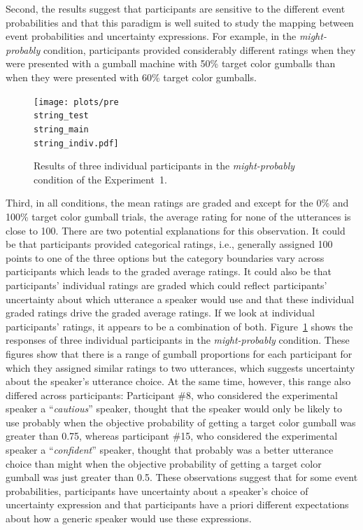 \documentclass[man, floatsintext]{apa6}
\begin{document}
Second, the results suggest that participants are sensitive to the different event probabilities and that this paradigm is well suited to study 
the mapping between event probabilities and uncertainty expressions. For example, in the \textit{might-probably} condition, participants
provided considerably different ratings when they were presented with a gumball machine with 50\% target color gumballs than when they
were presented with 60\% target color gumballs.

\begin{figure}
\texttt{[image: plots/pre\\string\_test\\string\_main\\string\_indiv.pdf]}
\caption{Results of three individual participants in the \emph{might-probably} condition of the Experiment~1. \label{fig:norming-results-indiv}}
\end{figure}


Third, in all conditions, the mean ratings are graded and except for the 0\% and 100\% target color gumball trials, the average rating for none of the
utterances is close to 100. There are two potential explanations for this observation. It could be that participants provided categorical ratings, i.e.,
generally assigned 100 points to one of the three options but the category boundaries vary across participants which leads to the graded average ratings.
It could also be that participants' individual ratings are graded which could reflect participants' uncertainty about which utterance a speaker would use 
and that these individual graded ratings drive the  graded average ratings. If we look at individual participants' ratings, it appears to be a combination of both.
Figure~\ref{fig:norming-results-indiv} shows the responses of three individual participants in the \emph{might-probably} condition. These figures show that there 
is a range of gumball proportions for each participant for which they assigned similar ratings to two utterances, which suggests uncertainty about the speaker's 
utterance choice. At the same time, however, this range also differed across participants: Participant \#8, who considered the experimental speaker a 
``\textit{cautious}'' speaker, thought that the speaker would only be likely to use {\sc probably} 
when the objective probability of getting a target color gumball was greater than 0.75, whereas participant \#15, who considered the experimental speaker a ``\textit{confident}'' speaker, thought that  {\sc probably} was a better utterance choice than {\sc might} 
when the objective probability of getting a target color gumball was just greater than 0.5. These observations suggest that for some event probabilities, participants have uncertainty  about a 
speaker's choice of uncertainty expression and that participants have a priori different expectations about how a generic speaker would use these expressions.
\end{document}
